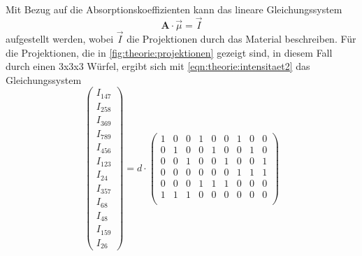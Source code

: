     Mit Bezug auf die Absorptionskoeffizienten kann das lineare Gleichungssystem
    \begin{equation}
        \symbf{A} \cdot \vec{\mu} = \vec{I}
    \end{equation}
    aufgestellt werden,
    wobei $\vec{I}$ die Projektionen durch das Material beschreiben.
    Für die Projektionen,
    die in \autoref{fig:theorie:projektionen} gezeigt sind,
    in diesem Fall durch einen 3x3x3 Würfel,
    ergibt sich mit \autoref{eqn:theorie:intensitaet2} das Gleichungssystem
    \begin{equation}
        \begin{pmatrix}
            I_{147} \\
            I_{258} \\
            I_{369} \\
            I_{789} \\
            I_{456} \\
            I_{123} \\
            I_{24}  \\
            I_{357} \\
            I_{68}  \\
            I_{48}  \\
            I_{159} \\
            I_{26}
        \end{pmatrix}
        = d \cdot
        \begin{pmatrix}
            1        & 0        & 0        & 1        & 0        & 0        & 1        & 0        & 0        \\
            0        & 1        & 0        & 0        & 1        & 0        & 0        & 1        & 0        \\
            0        & 0        & 1        & 0        & 0        & 1        & 0        & 0        & 1        \\
            0        & 0        & 0        & 0        & 0        & 0        & 1        & 1        & 1        \\
            0        & 0        & 0        & 1        & 1        & 1        & 0        & 0        & 0        \\
            1        & 1        & 1        & 0        & 0        & 0        & 0        & 0        & 0        \\

\end{pmatrix}
\end{equation}
